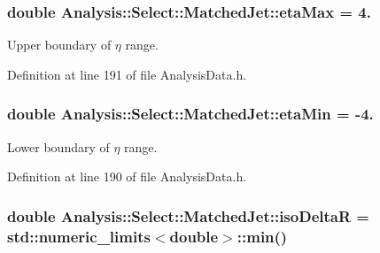 \subsubsection[{\texorpdfstring{eta\+Max}{etaMax}}]{\setlength{\rightskip}{0pt plus 5cm}double Analysis\+::\+Select\+::\+Matched\+Jet\+::eta\+Max = 4.\hspace{0.3cm}{\ttfamily [static]}}\hypertarget{namespaceAnalysis_1_1Select_1_1MatchedJet_aace30370f95bae87ac3c44a942dc718d}{}\label{namespaceAnalysis_1_1Select_1_1MatchedJet_aace30370f95bae87ac3c44a942dc718d}


Upper boundary of $ \eta $ range. 



Definition at line 191 of file Analysis\+Data.\+h.

\subsubsection[{\texorpdfstring{eta\+Min}{etaMin}}]{\setlength{\rightskip}{0pt plus 5cm}double Analysis\+::\+Select\+::\+Matched\+Jet\+::eta\+Min = -\/4.\hspace{0.3cm}{\ttfamily [static]}}\hypertarget{namespaceAnalysis_1_1Select_1_1MatchedJet_a228bc6198c8f81574a0a079278850e20}{}\label{namespaceAnalysis_1_1Select_1_1MatchedJet_a228bc6198c8f81574a0a079278850e20}


Lower boundary of $ \eta $ range. 



Definition at line 190 of file Analysis\+Data.\+h.

\subsubsection[{\texorpdfstring{iso\+DeltaR}{isoDeltaR}}]{\setlength{\rightskip}{0pt plus 5cm}double Analysis\+::\+Select\+::\+Matched\+Jet\+::iso\+DeltaR = std\+::numeric\+\_\+limits$<$double$>$\+::min()\hspace{0.3cm}{\ttfamily [static]}}\hypertarget{namespaceAnalysis_1_1Select_1_1MatchedJet_a1fd4c19e756cb09ffce16b4e28f29b1e}{}\label{namespaceAnalysis_1_1Select_1_1MatchedJet_a1fd4c19e756cb09ffce16b4e28f29b1e}


